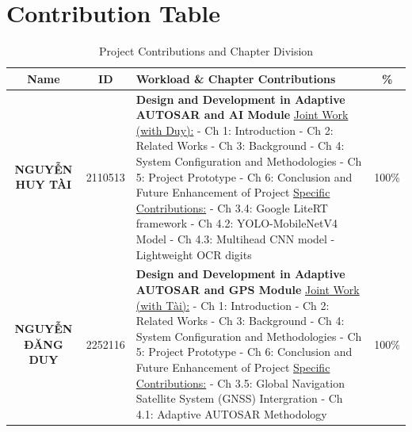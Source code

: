 \chapter*{Contribution Table}


\begin{table}[h!]
\centering
\renewcommand{\arraystretch}{1.3} %
\begin{tabular}{|c|c|p{8cm}|c|}
\hline
\textbf{Name} & \textbf{ID} & \textbf{Workload \& Chapter Contributions} & \textbf{\%} \\
\hline
\textbf{NGUYỄN HUY TÀI} & 2110513 & 
\textbf{Design and Development in Adaptive AUTOSAR and AI Module} \newline
\underline{Joint Work (with Duy):} \newline
- Ch 1: Introduction \newline
- Ch 2: Related Works \newline
- Ch 3: Background \newline
- Ch 4: System Configuration and Methodologies \newline
- Ch 5: Project Prototype \newline
- Ch 6: Conclusion and Future Enhancement of Project \newline
\underline{Specific Contributions:} \newline
- Ch 3.4: Google LiteRT framework \newline
- Ch 4.2: YOLO-MobileNetV4 Model \newline
- Ch 4.3: Multihead CNN model - Lightweight OCR digits & 100\% \\
\hline
\textbf{NGUYỄN ĐĂNG DUY} & 2252116 & 
\textbf{Design and Development in Adaptive AUTOSAR and GPS Module} \newline
\underline{Joint Work (with Tài):} \newline
- Ch 1: Introduction \newline
- Ch 2: Related Works \newline
- Ch 3: Background \newline
- Ch 4: System Configuration and Methodologies \newline
- Ch 5: Project Prototype \newline
- Ch 6: Conclusion and Future Enhancement of Project \newline
\underline{Specific Contributions:} \newline
- Ch 3.5: Global Navigation Satellite System (GNSS) Intergration \newline
- Ch 4.1: Adaptive AUTOSAR Methodology & 100\% \\
\hline
\end{tabular}
\caption{Project Contributions and Chapter Division}
\label{tab:contributions}
\end{table}

\clearpage
